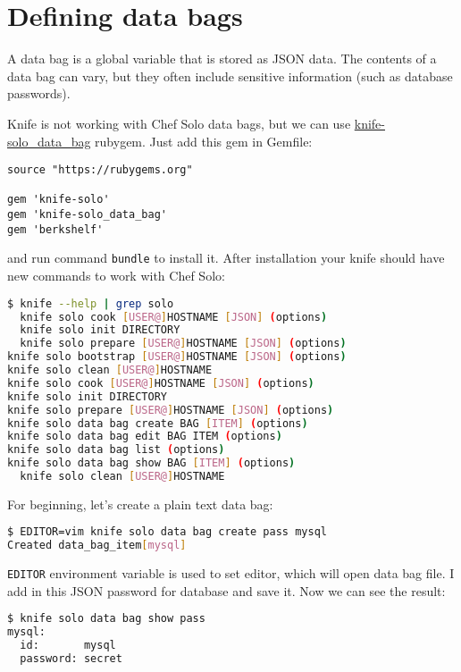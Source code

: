 \section{Defining data bags}
\label{sec:solo-data-bag}

A data bag is a global variable that is stored as JSON data. The contents of a data bag can vary, but they often include sensitive information (such as database passwords).

Knife is not working with Chef Solo data bags, but we can use \href{http://thbishop.com/knife-solo\_data\_bag/}{knife-solo\_data\_bag} rubygem. Just add this gem in Gemfile:

\begin{lstlisting}[label=lst:my-cloud-chef-databag1,title=my-cloud/Gemfile]
source "https://rubygems.org"

gem 'knife-solo'
gem 'knife-solo_data_bag'
gem 'berkshelf'
\end{lstlisting}

and run command \lstinline!bundle! to install it. After installation your knife should have new commands to work with Chef Solo:

\begin{lstlisting}[language=Bash,label=lst:my-cloud-chef-databag2]
$ knife --help | grep solo
  knife solo cook [USER@]HOSTNAME [JSON] (options)
  knife solo init DIRECTORY
  knife solo prepare [USER@]HOSTNAME [JSON] (options)
knife solo bootstrap [USER@]HOSTNAME [JSON] (options)
knife solo clean [USER@]HOSTNAME
knife solo cook [USER@]HOSTNAME [JSON] (options)
knife solo init DIRECTORY
knife solo prepare [USER@]HOSTNAME [JSON] (options)
knife solo data bag create BAG [ITEM] (options)
knife solo data bag edit BAG ITEM (options)
knife solo data bag list (options)
knife solo data bag show BAG [ITEM] (options)
  knife solo clean [USER@]HOSTNAME
\end{lstlisting}

For beginning, let's create a plain text data bag:

\begin{lstlisting}[language=Bash,label=lst:my-cloud-chef-databag3]
$ EDITOR=vim knife solo data bag create pass mysql
Created data_bag_item[mysql]
\end{lstlisting}

\lstinline!EDITOR! environment variable is used to set editor, which will open data bag file. I add in this JSON password for database and save it. Now we can see the result:

\begin{lstlisting}[language=Bash,label=lst:my-cloud-chef-databag4]
$ knife solo data bag show pass
mysql:
  id:       mysql
  password: secret
\end{lstlisting}

